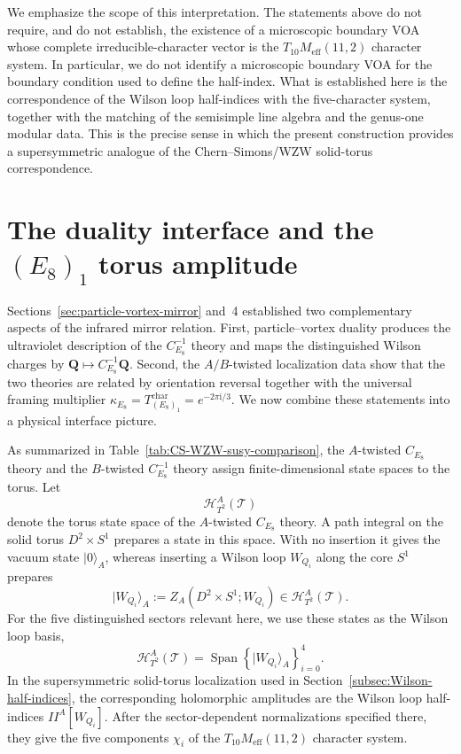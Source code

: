 \documentclass[11pt,a4paper]{article}
\numberwithin{equation}{section}
\begin{document}
We emphasize the scope of this interpretation.  The statements above do not require, and do not establish, the existence of a microscopic boundary VOA whose complete irreducible-character vector is the $T_{10}M_{\mathrm{eff}}(11,2)$ character system.  In particular, we do not identify a microscopic boundary VOA for the boundary condition used to define the half-index.  What is established here is the correspondence of the Wilson loop half-indices with the five-character system, together with the matching of the semisimple line algebra and the genus-one modular data.  This is the precise sense in which the present construction provides a supersymmetric analogue of the Chern--Simons/WZW solid-torus correspondence.

\section{The duality interface and the $(E_8)_1$ torus amplitude}
\label{sec:E8-interface}

Sections~\ref{sec:particle-vortex-mirror} and~4 established two complementary aspects of the infrared mirror relation.  First, particle--vortex duality produces the ultraviolet description of the $C_{E_8}^{-1}$ theory and maps the distinguished Wilson charges by $\boldsymbol Q\mapsto C_{E_8}^{-1}\boldsymbol Q$.  Second, the $A/B$-twisted localization data show that the two theories are related by orientation reversal together with the universal framing multiplier $\kappa_{E_8}=T_{(E_8)_1}^{\mathrm{char}}=e^{-2\pi \mathrm{i}/3}$.  We now combine these statements into a physical interface picture.

As summarized in Table~\ref{tab:CS-WZW-susy-comparison}, the $A$-twisted $C_{E_8}$ theory and the $B$-twisted $C_{E_8}^{-1}$ theory assign finite-dimensional state spaces to the torus.  Let
\begin{equation}
  \mathscr H_{T^2}^{A}(\mathcal T)
\end{equation}
denote the torus state space of the $A$-twisted $C_{E_8}$ theory.  A path integral on the solid torus $D^2\times S^1$ prepares a state in this space.  With no insertion it gives the vacuum state $|0\rangle_A$, whereas inserting a Wilson loop $W_{Q_i}$ along the core $S^1$ prepares
\begin{equation}
  |W_{Q_i}\rangle_A
  :=Z_A(D^2\times S^1;W_{Q_i})
  \in \mathscr H_{T^2}^{A}(\mathcal T).
  \label{eq:A-solid-torus-Wilson-state}
\end{equation}
For the five distinguished sectors relevant here, we use these states as the Wilson loop basis,
\begin{equation}
  \mathscr H_{T^2}^{A}(\mathcal T)
  =\operatorname{Span}
  \left\{|W_{Q_i}\rangle_A\right\}_{i=0}^{4}.
  \label{eq:A-torus-state-space-Wilson-basis}
\end{equation}
In the supersymmetric solid-torus localization used in Section~\ref{subsec:Wilson-half-indices}, the corresponding holomorphic amplitudes are the Wilson loop half-indices $I\!\!I^A[W_{Q_i}]$.  After the sector-dependent normalizations specified there, they give the five components $\chi_i$ of the $T_{10}M_{\mathrm{eff}}(11,2)$ character system.
\end{document}
